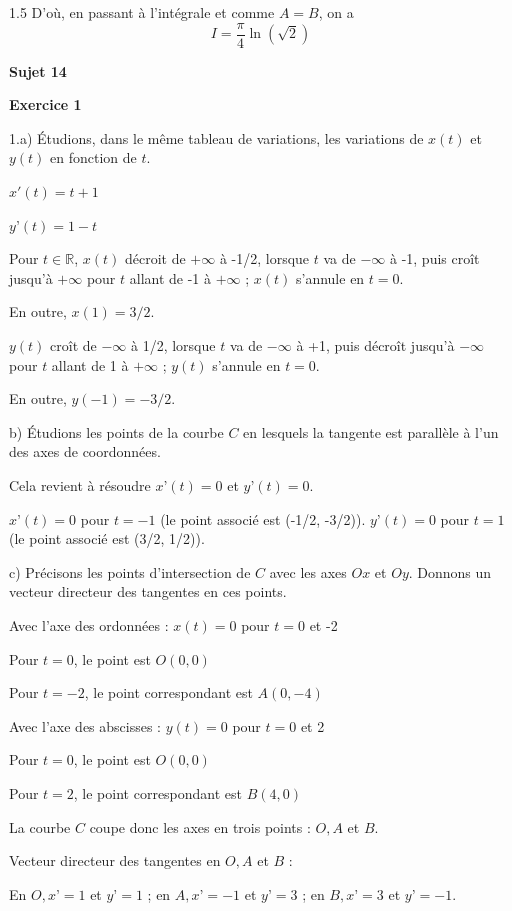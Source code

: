 \documentclass[12pt]{article}
\begin{document}
\begin{spacing}{1.5}
D'où, en passant à l'intégrale et comme $A = B$, on a 
\[I=\frac{\pi}{4}\ln(\sqrt{2})\]
 


\medskip\textbf{Sujet 14}

\textbf{Exercice 1}

1.a) Étudions, dans le même tableau de variations, les variations de $x(t)$ et $y(t)$ en fonction de $t$. 

$x'(t) = t + 1$
 
$y’(t) = 1-t $

Pour $t\in \mathbb{R}$, $x(t)$ décroit de $+\infty$ à -1/2, lorsque $t$ va de $-\infty
$ à -1, puis croît jusqu'à $+\infty$ pour $t$ allant de -1 à $+\infty$ ; $x(t)$ s'annule en $t = 0$. 

En outre, $x(1) = 3/2$.

\medskip 
$y(t)$ croît de $-\infty$ à 1/2, lorsque $t$ va de $-\infty$ à +1, puis décroît jusqu'à $-\infty$ pour $t$ allant de 1 à $+\infty$ ; $y(t)$ s'annule en $t = 0$. 

En outre, $y(-1) = -3/2$. 

b) Étudions les points de la courbe $C$ en lesquels la tangente est parallèle à l'un des axes de 
coordonnées. 

Cela revient à résoudre $x’(t) = 0$ et $y’(t) = 0$.  

$x’(t) = 0$ pour $t = -1$ (le point associé est (-1/2, -3/2)). 
$y’(t) = 0$ pour $t = 1$ (le point associé est (3/2, 1/2)). 

c) Précisons les points d'intersection de $C$ avec les axes $Ox$ et $Oy$. Donnons un vecteur 
directeur des tangentes en ces points. 

Avec l'axe des ordonnées : $x(t) = 0$ pour $t = 0$ et -2 

Pour $t = 0$, le point est $O (0, 0) $

Pour $t = -2$, le point correspondant est $A(0, -4)$  

Avec l'axe des abscisses : $y(t) = 0$ pour $t = 0$ et 2 

Pour $t = 0$, le point est $O (0, 0)$ 

Pour $t = 2$, le point correspondant est $B(4, 0)$  

La courbe $C$ coupe donc les axes en trois points : $O, A$ et $B$. 

Vecteur directeur des tangentes en $O, A$ et $B$ :
 
En $O, x’ = 1$ et $y’ = 1$ ; en $A, x’ = -1$ et $y’ = 3$ ; en $B, x’ = 3$ et $y’ = -1$. 


\end{spacing}
\end{document}
